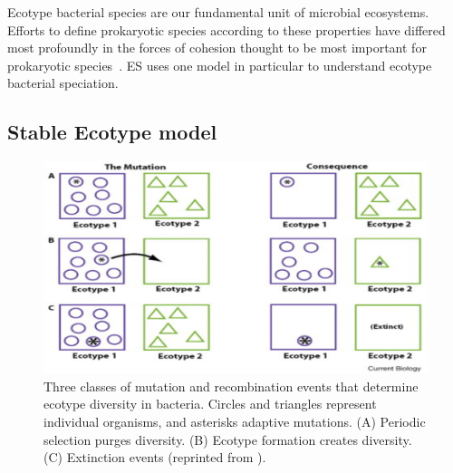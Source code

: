 Ecotype bacterial species are our fundamental unit of microbial ecosystems.
Efforts to define prokaryotic species according to these properties have differed most profoundly in the forces of cohesion thought to be most important for prokaryotic species~\cite{cohan2008origins}.
ES uses one model in particular to understand ecotype bacterial speciation.

\subsection*{Stable Ecotype model}

\begin{figure}[h!]
 \centering
 \label{fig:StableEvents}
 \includegraphics{images/StableEcotypeEvents-CH2}
 \caption[Events predicted by the Stable Ecotype model.]{Three classes of mutation and recombination events that determine ecotype diversity in bacteria. Circles and triangles represent individual organisms, and asterisks adaptive mutations. (A) Periodic selection purges diversity. (B) Ecotype formation creates diversity. (C) Extinction events (reprinted from \protect\cite{cohan2007systematics}).}
 \label{fig:StableEvents}
\end{figure}

